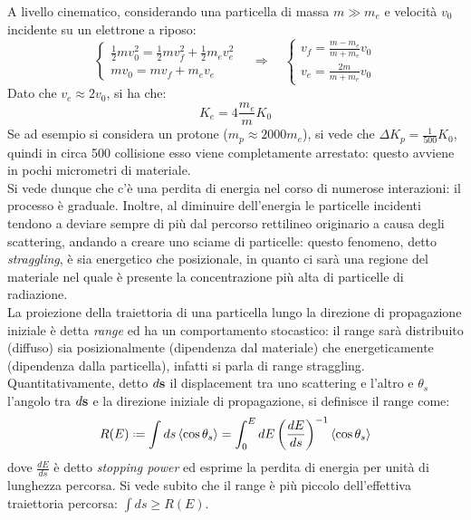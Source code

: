A livello cinematico, considerando una particella di massa $ m \gg m_e $ e velocità $ v_0 $ incidente su un elettrone a riposo:
\begin{equation*}
	\begin{cases}
		\frac{1}{2} m v_0^2 = \frac{1}{2} m v_f^2 + \frac{1}{2} m_e v_e^2 \\
		m v_0 = m v_f + m_e v_e
	\end{cases}
	\quad\Rightarrow\quad
	\begin{cases}
		v_f = \frac{m - m_e}{m + m_e} v_0 \\
		v_e = \frac{2m}{m + m_e} v_0
	\end{cases}
\end{equation*}
Dato che $ v_e \approx 2v_0 $, si ha che:
\begin{equation}
	K_e = 4 \frac{m_e}{m} K_0
	\label{eq:3.2}
\end{equation}
Se ad esempio si considera un protone ($ m_p \approx 2000 m_e $), si vede che $ \Delta K_p = \frac{1}{500} K_0 $, quindi in circa 500 collisione esso viene completamente arrestato: questo avviene in pochi micrometri di materiale.\\
Si vede dunque che c'è una perdita di energia nel corso di numerose interazioni: il processo è graduale. Inoltre, al diminuire dell'energia le particelle incidenti tendono a deviare sempre di più dal percorso rettilineo originario a causa degli scattering, andando a creare uno sciame di particelle: questo fenomeno, detto \textit{straggling}, è sia energetico che posizionale, in quanto ci sarà una regione del materiale nel quale è presente la concentrazione più alta di particelle di radiazione.\\
La proiezione della traiettoria di una particella lungo la direzione di propagazione iniziale è detta \textit{range} ed ha un comportamento stocastico: il range sarà distribuito (diffuso) sia posizionalmente (dipendenza dal materiale) che energeticamente (dipendenza dalla particella), infatti si parla di range straggling. Quantitativamente, detto $ d\mathbf{s} $ il displacement tra uno scattering e l'altro e $ \theta_s $ l'angolo tra $ d\mathbf{s} $ e la direzione iniziale di propagazione, si definisce il range come:
\begin{equation}
	R(E) \defeq \int ds \braket{\cos \theta_s} = \int_0^E dE \left( \frac{dE}{ds} \right)^{-1} \braket{\cos \theta_s}
	\label{eq:}
\end{equation}
dove $ \frac{dE}{ds} $ è detto \textit{stopping power} ed esprime la perdita di energia per unità di lunghezza percorsa. Si vede subito che il range è più piccolo dell'effettiva traiettoria percorsa: $ \int ds \ge R(E) $.

